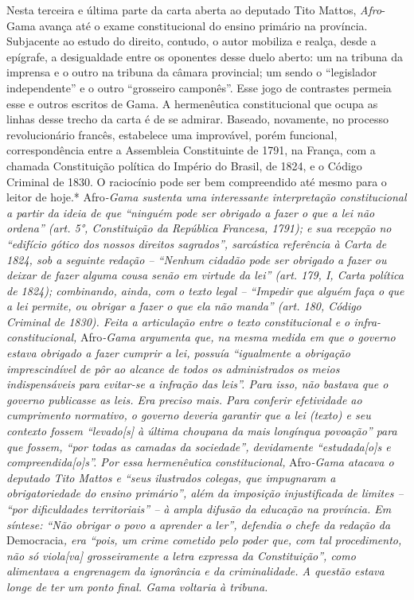 \begin{didascalia}
Nesta terceira e última parte da carta aberta ao deputado Tito
Mattos,\emph{ Afro}-Gama avança até o exame constitucional do ensino
primário na província. Subjacente ao estudo do direito, contudo, o autor
mobiliza e realça, desde a epígrafe, a desigualdade entre os oponentes
desse duelo aberto: um na tribuna da imprensa e o outro na tribuna da
câmara provincial; um sendo o ``legislador independente'' e o outro
``grosseiro camponês''. Esse jogo de contrastes permeia esse e outros
escritos de Gama. A hermenêutica constitucional que ocupa as linhas
desse trecho da carta é de se admirar. Baseado, novamente, no processo
revolucionário francês, estabelece uma improvável, porém funcional,
correspondência entre a Assembleia Constituinte de 1791, na França, com
a chamada Constituição política do Império do Brasil, de 1824, e o
Código Criminal de 1830. O raciocínio pode ser bem compreendido até
mesmo para o leitor de hoje.* Afro\emph{-Gama sustenta uma interessante
interpretação constitucional a partir da ideia de que ``ninguém pode ser
obrigado a fazer o que a lei não ordena'' (art. 5°, Constituição da
República Francesa, 1791); e sua recepção no ``edifício gótico dos nossos
direitos sagrados'', sarcástica referência à Carta de 1824, sob a
seguinte redação -- ``Nenhum cidadão pode ser obrigado a fazer ou deixar
de fazer alguma cousa senão em virtude da lei'' (art. 179, I, Carta
política de 1824); combinando, ainda, com o texto legal -- ``Impedir que
alguém faça o que a lei permite, ou obrigar a fazer o que ela não manda''
(art. 180, Código Criminal de 1830). Feita a articulação entre o texto
constitucional e o infra-constitucional,} Afro\emph{-Gama argumenta que,
na mesma medida em que o governo estava obrigado a fazer cumprir a lei,
possuía ``igualmente a obrigação imprescindível de pôr ao alcance de
todos os administrados os meios indispensáveis para evitar-se a infração
das leis''. Para isso, não bastava que o governo publicasse as leis. Era
preciso mais. Para conferir efetividade ao cumprimento normativo, o
governo deveria garantir que a lei (texto) e seu contexto fossem
``levado{[}s{]} à última choupana da mais longínqua povoação'' para que
fossem, ``por todas as camadas da sociedade'', devidamente
``estudada{[}o{]}s e compreendida{[}o{]}s''. Por essa hermenêutica
constitucional,} Afro\emph{-Gama atacava o deputado Tito Mattos e ``seus
ilustrados colegas, que impugnaram a obrigatoriedade do ensino
primário'', além da imposição injustificada de limites -- ``por
dificuldades territoriais'' -- à ampla difusão da educação na província.
Em síntese: ``Não obrigar o povo a aprender a ler'', defendia o chefe da
redação da} Democracia\emph{, era ``pois, um crime cometido pelo poder
que, com tal procedimento, não só viola{[}va{]} grosseiramente a letra
expressa da Constituição'', como alimentava a engrenagem da ignorância e
da criminalidade. A questão estava longe de ter um ponto final. Gama
voltaria à tribuna.}
\end{didascalia}

